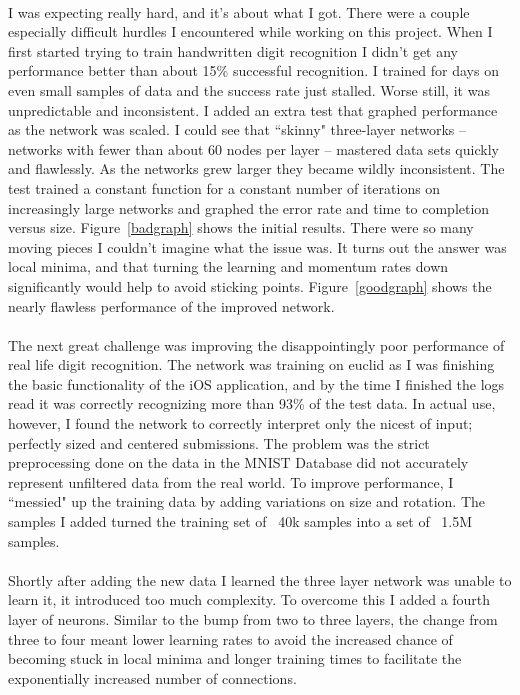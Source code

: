 \documentclass{article}
\begin{document}
    \paragraph{}I was expecting really hard, and it's about what I got. There were 
    a couple especially difficult hurdles I encountered while working on this 
    project. When I first started trying to train handwritten digit recognition I 
    didn't get any performance better than about 15\% successful recognition. I 
    trained for days on even small samples of data and the success rate just 
    stalled. Worse still, it was unpredictable and inconsistent. I added an extra
    test that graphed performance as the network was scaled. I could see 
    that ``skinny" three-layer networks -- networks with fewer than about 60 nodes 
    per layer -- mastered data sets quickly and flawlessly. As the networks grew 
    larger they became wildly inconsistent. The test trained a constant 
    function for a constant number of iterations on increasingly large networks and 
    graphed the error rate and time to completion versus size. Figure~\ref{badgraph}
    shows the initial results. There were so many moving pieces I couldn't imagine 
    what the issue was. It turns out the answer was local minima, and that turning the 
    learning and momentum rates down significantly would help to avoid sticking points.
    Figure~\ref{goodgraph} shows the nearly flawless performance of the improved 
    network.

    \paragraph{}The next great challenge was improving the disappointingly poor 
    performance of real life digit recognition. The network was training on euclid 
    as I was finishing the basic functionality of the iOS application, and by the 
    time I finished the logs read it was correctly recognizing more than 93\% of 
    the test data. In actual use, however, I found the network to correctly 
    interpret only the nicest of input; perfectly sized and centered submissions.
    The problem was the strict preprocessing done on the data in the MNIST Database
    did not accurately represent unfiltered data from the real world. To improve 
    performance, I ``messied" up the training data by adding variations on size 
    and rotation. The samples I added turned the training set of ~40k samples 
    into a set of ~1.5M samples. 

    \paragraph{}Shortly after adding the new data I learned the three layer 
    network was unable to learn it, it introduced too much complexity.
    To overcome this I added a fourth layer of neurons.
    Similar to the bump from two to three layers, the change from three to four 
    meant lower learning rates to avoid the increased chance of becoming stuck in 
    local minima and longer training times to facilitate the exponentially 
    increased number of connections. 
    
\end{document}
